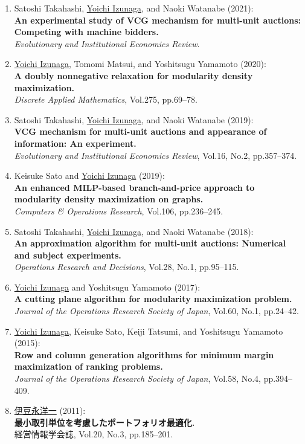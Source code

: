 \documentclass[dvipdfmx,9pt,a4paper]{article}
\begin{document}
\begin{enumerate}

\item Satoshi Takahashi, \underline{Yoichi Izunaga}, and Naoki Watanabe (2021):\\
{\bf An experimental study of VCG mechanism for multi-unit auctions: Competing with machine bidders.}\\
{\it Evolutionary and Institutional Economics Review}.

\item \underline{Yoichi Izunaga}, Tomomi Matsui, and Yoshitsugu Yamamoto (2020):\\
{\bf A doubly nonnegative relaxation for modularity density maximization.}\\
{\it Discrete Applied Mathematics}, Vol.275, pp.69--78.

\item Satoshi Takahashi, \underline{Yoichi Izunaga}, and Naoki Watanabe (2019):\\
{\bf VCG mechanism for multi-unit auctions and appearance of information: An experiment.}\\
{\it Evolutionary and Institutional Economics Review}, Vol.16, No.2, pp.357--374.

\item Keisuke Sato and \underline{Yoichi Izunaga} (2019):\\
{\bf An enhanced MILP-based branch-and-price approach to modularity density maximization on graphs.}\\
{\it Computers \& Operations Research}, Vol.106, pp.236--245.

\item Satoshi Takahashi, \underline{Yoichi Izunaga}, and Naoki Watanabe (2018):\\
{\bf An approximation algorithm for multi-unit auctions: Numerical and subject experiments.}\\
{\it Operations Research and Decisions}, Vol.28, No.1, pp.95--115.

\item \underline{Yoichi Izunaga} and Yoshitsugu Yamamoto (2017):\\
{\bf A cutting plane algorithm for modularity maximization problem.}\\
{\it Journal of the Operations Research Society of Japan}, Vol.60, No.1, pp.24--42.

\item \underline{Yoichi Izunaga}, Keisuke Sato, Keiji Tatsumi, and Yoshitsugu Yamamoto (2015):\\
{\bf Row and column generation algorithms for minimum margin maximization of ranking problems.}\\
{\it Journal of the Operations Research Society of Japan}, Vol.58, No.4, pp.394--409.

\item \underline{伊豆永洋一} (2011):\\
{\bf 最小取引単位を考慮したポートフォリオ最適化.}\\
経営情報学会誌, Vol.20, No.3, pp.185--201.

\end{enumerate}
\end{document}
